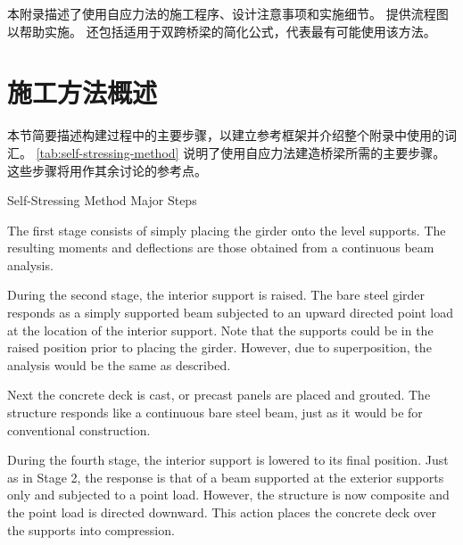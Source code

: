 本附录描述了使用自应力法的施工程序、设计注意事项和实施细节。 提供流程图以帮助实施。 还包括适用于双跨桥梁的简化公式，代表最有可能使用该方法。

\section{施工方法概述}
本节简要描述构建过程中的主要步骤，以建立参考框架并介绍整个附录中使用的词汇。 \cref{tab:self-stressing-method} 说明了使用自应力法建造桥梁所需的主要步骤。 这些步骤将用作其余讨论的参考点。

\begin{table}
  \caption{Self-Stressing Method Major Steps}\label{tab:self-stressing-method}
\end{table}

The first stage consists of simply placing the girder onto the level supports. The resulting moments and deflections are those obtained from a continuous beam analysis.

During the second stage, the interior support is raised. The bare steel girder responds as a simply supported beam subjected to an upward directed point load at the location of the interior support. Note that the supports could be in the raised position prior to placing the girder. However, due to superposition, the analysis would be the same as described.


Next the concrete deck is cast, or precast panels are placed and grouted. The structure responds like a continuous bare steel beam, just as it would be for conventional construction.

During the fourth stage, the interior support is lowered to its final position. Just as in Stage 2, the response is that of a beam supported at the exterior supports only and subjected to a point load. However, the structure is now composite and the point load is directed downward. This action places the concrete deck over the supports into compression.

